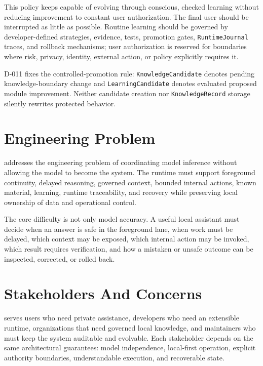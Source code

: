 \documentclass[11pt]{report}
\begin{document}
This policy keeps \Madre capable of evolving through conscious, checked learning without reducing improvement to constant user authorization. The final user should be interrupted as little as possible. Routine learning should be governed by developer-defined strategies, evidence, tests, promotion gates, \texttt{RuntimeJournal} traces, and rollback mechanisms; user authorization is reserved for boundaries where risk, privacy, identity, external action, or policy explicitly requires it.

D-011 fixes the controlled-promotion rule: \texttt{KnowledgeCandidate} denotes pending knowledge-boundary change and \texttt{LearningCandidate} denotes evaluated proposed module improvement. Neither candidate creation nor \texttt{KnowledgeRecord} storage silently rewrites protected behavior.


\section{Engineering Problem}

\Madre addresses the engineering problem of coordinating model inference without allowing the model to become the system. The runtime must support foreground continuity, delayed reasoning, governed context, bounded internal actions, known material, learning, runtime traceability, and recovery while preserving local ownership of data and operational control.

The core difficulty is not only model accuracy. A useful local assistant must decide when an answer is safe in the foreground lane, when work must be delayed, which context may be exposed, which internal action may be invoked, which result requires verification, and how a mistaken or unsafe outcome can be inspected, corrected, or rolled back.

\section{Stakeholders And Concerns}

\Madre serves users who need private assistance, developers who need an extensible runtime, organizations that need governed local knowledge, and maintainers who must keep the system auditable and evolvable. Each stakeholder depends on the same architectural guarantees: model independence, local-first operation, explicit authority boundaries, understandable execution, and recoverable state.
\end{document}
